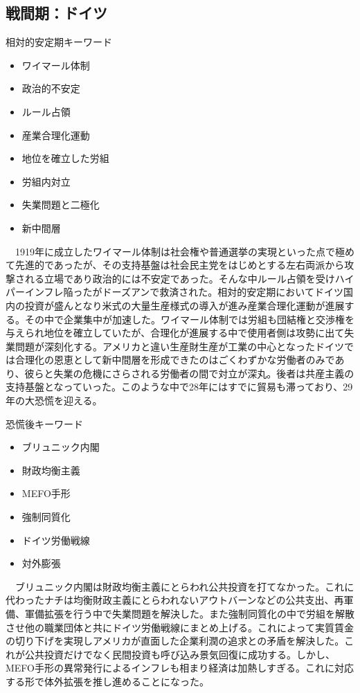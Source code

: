 \documentclass{jsarticle}
\begin{document}
\subsection{戦間期：ドイツ}
相対的安定期キーワード
\begin{itemize}
\item ワイマール体制
\item 政治的不安定
\item ルール占領
\item 産業合理化運動
\item 地位を確立した労組
\item 労組内対立
\item 失業問題と二極化
\item 新中間層
\end{itemize}
　1919年に成立したワイマール体制は社会権や普通選挙の実現といった点で極めて先進的であったが、その支持基盤は社会民主党をはじめとする左右両派から攻撃される立場であり政治的には不安定であった。そんな中ルール占領を受けハイパーインフレ陥ったがドーズアンで救済された。相対的安定期においてドイツ国内の投資が盛んとなり米式の大量生産様式の導入が進み産業合理化運動が進展する。その中で企業集中が加速した。ワイマール体制では労組も団結権と交渉権を与えられ地位を確立していたが、合理化が進展する中で使用者側は攻勢に出て失業問題が深刻化する。アメリカと違い生産財生産が工業の中心となったドイツでは合理化の恩恵として新中間層を形成できたのはごくわずかな労働者のみであり、彼らと失業の危機にさらされる労働者の間で対立が深丸。後者は共産主義の支持基盤となっていった。このような中で28年にはすでに貿易も滞っており、29年の大恐慌を迎える。

恐慌後キーワード
\begin{itemize}
\item ブリュニック内閣
\item 財政均衡主義
\item MEFO手形
\item 強制同質化
\item ドイツ労働戦線
\item 対外膨張
\end{itemize}
　ブリュニック内閣は財政均衡主義にとらわれ公共投資を打てなかった。これに代わったナチは均衡財政主義にとらわれないアウトバーンなどの公共支出、再軍備、軍備拡張を行う中で失業問題を解決した。また強制同質化の中で労組を解散させ他の職業団体と共にドイツ労働戦線にまとめ上げる。これによって実質賃金の切り下げを実現しアメリカが直面した企業利潤の追求との矛盾を解決した。これが公共投資だけでなく民間投資も呼び込み景気回復に成功する。しかし、MEFO手形の異常発行によるインフレも相まり経済は加熱しすぎる。これに対応する形で体外拡張を推し進めることになった。
\end{document}
